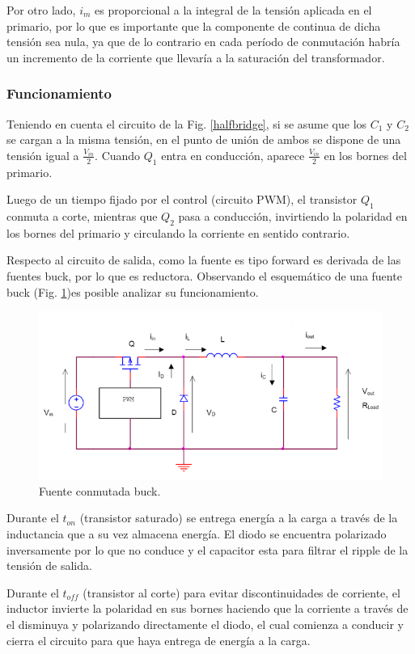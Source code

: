 \documentclass[11pt, a4paper]{article}
\begin{document}
Por otro lado, $i_m$ es proporcional a la integral de la tensión aplicada en el primario, por lo que es importante que la componente de continua de dicha tensión sea nula, ya que de lo contrario en cada período de conmutación habría un incremento de la corriente que llevaría a la saturación del transformador.

\subsubsection{Funcionamiento}
Teniendo en cuenta el circuito de la Fig. \ref{halfbridge}, si se asume que los $C_1$ y $C_2$ se cargan a la misma tensión, en el punto de unión de ambos se dispone de una tensión igual a $\frac{V_{in}}{2}$. Cuando $Q_1$ entra en conducción, aparece $\frac{V_{in}}{2}$ en los bornes del primario. 

Luego de un tiempo fijado por el control (circuito PWM), el transistor $Q_1$ conmuta a corte, mientras que $Q_2$ pasa a conducción, invirtiendo la polaridad en los bornes del primario y circulando la corriente en sentido contrario.

Respecto al circuito de salida, como la fuente es tipo forward es derivada de las fuentes buck, por lo que es reductora. Observando el esquemático de una fuente buck (Fig. \ref{buck})es posible analizar su funcionamiento.
\begin{figure}[h]
	\centering
	\includegraphics[width = 10 cm]{Imagenes/buck}
	\caption{Fuente conmutada buck.}
	\label{buck}
\end{figure}

Durante el $t_{on}$ (transistor saturado) se entrega energía a la carga a través de la inductancia que a su vez almacena energía. El diodo se encuentra polarizado inversamente por lo que no conduce y el capacitor esta para filtrar el ripple de la tensión de salida.

Durante el $t_{off}$ (transistor al corte) para evitar discontinuidades de corriente, el inductor invierte la polaridad en sus bornes haciendo que la corriente a través de el disminuya y polarizando directamente el diodo, el cual comienza a conducir y cierra el circuito para que haya entrega de energía a la carga.
\end{document}
